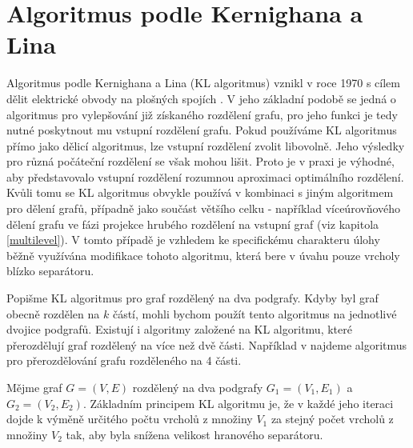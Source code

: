 \documentclass[11pt,american,czech,oneside]{book}
\theoremstyle{plain}
\theoremstyle{definition}
\begin{document}
\section{Algoritmus podle Kernighana a Lina}
\label{KLalgorithm}
Algoritmus podle Kernighana a Lina (KL algoritmus) vznikl v roce 1970 s cílem dělit elektrické obvody na plošných spojích \cite{keli:70}. V jeho základní podobě se jedná o algoritmus pro vylepšování již získaného rozdělení grafu, pro jeho funkci je tedy nutné poskytnout mu vstupní rozdělení grafu. Pokud používáme KL algoritmus přímo jako dělicí algoritmus, lze vstupní rozdělení zvolit libovolně. Jeho výsledky pro různá počáteční rozdělení se však mohou lišit. Proto je v praxi je výhodné, aby představovalo vstupní rozdělení rozumnou aproximaci optimálního rozdělení. Kvůli tomu se KL algoritmus obvykle používá v kombinaci s jiným algoritmem pro dělení grafů, případně jako součást většího celku - například víceúrovňového dělení grafu ve fázi projekce hrubého rozdělení na vstupní graf (viz kapitola \ref{multilevel}). V tomto případě je vzhledem ke specifickému charakteru úlohy běžně využívána modifikace tohoto algoritmu, která bere v úvahu pouze vrcholy blízko separátoru.

Popišme KL algoritmus pro graf rozdělený na dva podgrafy. Kdyby byl graf obecně rozdělen na $k$ částí, mohli bychom použít tento algoritmus na jednotlivé dvojice podgrafů. Existují i algoritmy založené na KL algoritmu, které přerozdělují graf rozdělený na více než dvě části. Například v \cite{suke:88} najdeme algoritmus pro přerozdělování grafu rozděleného na 4 části.

Mějme graf $G=(V,E)$ rozdělený na dva podgrafy $G_1=(V_1,E_1)$ a $G_2=(V_2,E_2)$. Základním principem KL algoritmu je, že v každé jeho iteraci dojde k výměně určitého počtu vrcholů z množiny $V_1$ za stejný počet vrcholů z množiny $V_2$ tak, aby byla snížena velikost hranového separátoru.
\end{document}
